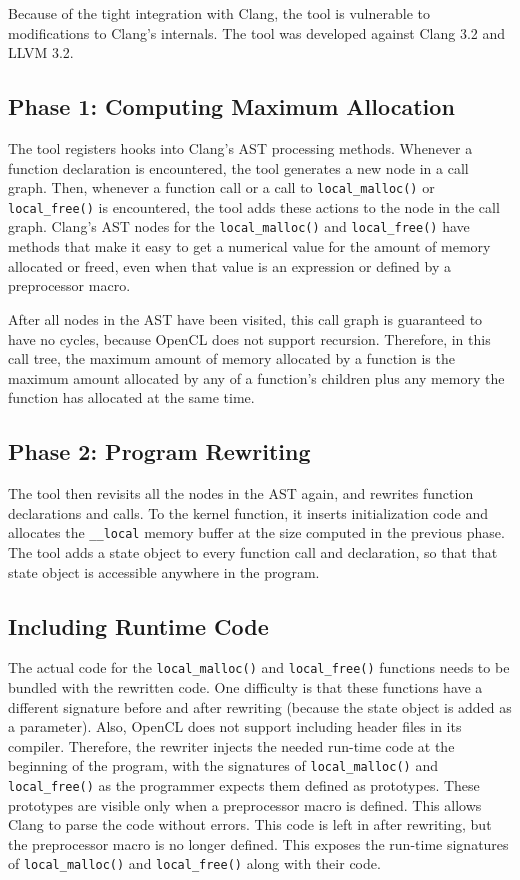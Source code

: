 \documentclass{article}
\begin{document}
Because of the tight integration with Clang, the tool is vulnerable to modifications to Clang's internals. The tool was developed against Clang 3.2 and LLVM 3.2.

\subsection{Phase 1: Computing Maximum Allocation}
The tool registers hooks into Clang's AST processing methods. Whenever a function declaration is encountered, the tool generates a new node in a call graph. Then, whenever a function call or a call to \texttt{local\_malloc()} or \texttt{local\_free()} is encountered, the tool adds these actions to the node in the call graph. Clang's AST nodes for the \texttt{local\_malloc()} and \texttt{local\_free()} have methods that make it easy to get a numerical value for the amount of memory allocated or freed, even when that value is an expression or defined by a preprocessor macro.

After all nodes in the AST have been visited, this call graph is guaranteed to have no cycles, because OpenCL does not support recursion. Therefore, in this call tree, the maximum amount of memory allocated by a function is the maximum amount allocated by any of a function's children plus any memory the function has allocated at the same time.

\subsection{Phase 2: Program Rewriting}
The tool then revisits all the nodes in the AST again, and rewrites function declarations and calls. To the kernel function, it inserts initialization code and allocates the \texttt{\_\_local} memory buffer at the size computed in the previous phase. The tool adds a state object to every function call and declaration, so that that state object is accessible anywhere in the program.

\subsection{Including Runtime Code}
The actual code for the \texttt{local\_malloc()} and \texttt{local\_free()} functions needs to be bundled with the rewritten code. One difficulty is that these functions have a different signature before and after rewriting (because the state object is added as a parameter). Also, OpenCL does not support including header files in its compiler. Therefore, the rewriter injects the needed run-time code at the beginning of the program, with the signatures of \texttt{local\_malloc()} and \texttt{local\_free()} as the programmer expects them defined as prototypes. These prototypes are visible only when a preprocessor macro is defined. This allows Clang to parse the code without errors. This code is left in after rewriting, but the preprocessor macro is no longer defined. This exposes the run-time signatures of \texttt{local\_malloc()} and \texttt{local\_free()} along with their code.
\end{document}
